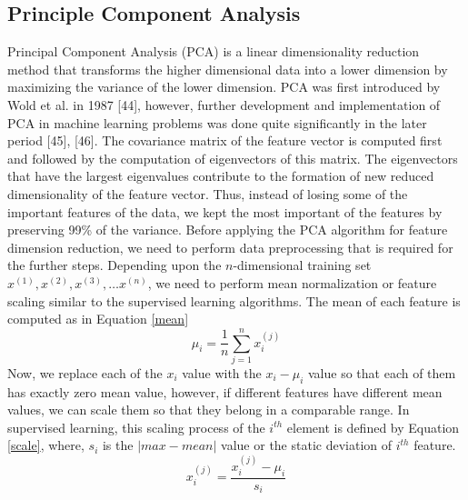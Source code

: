 \documentclass{llncs}
\begin{document}
\subsection{Principle Component Analysis}
Principal Component Analysis (PCA) is a linear dimensionality reduction method that transforms the higher dimensional data into a lower dimension by maximizing the variance of the lower dimension. PCA was first introduced by Wold et al. in 1987 [44], however, further development and implementation of PCA in machine learning problems was done quite significantly in the later period [45], [46]. The covariance matrix of the feature vector is computed first and followed by the computation of eigenvectors of this matrix. The eigenvectors that have the largest eigenvalues contribute to the formation of new reduced dimensionality of the feature vector. Thus, instead of losing some of the important features of the data, we kept the most important of the features by preserving 99\% of the variance.
Before applying the PCA algorithm for feature dimension reduction, we need to perform data preprocessing that is required for the further steps. Depending upon the $n$-dimensional training set $x^{(1)}, x^{(2)}, x^{(3)}, \hdots x^{(n)}$, we need to perform mean normalization or feature scaling similar to the supervised learning algorithms. The mean of each feature is computed as in Equation \ref{mean}
\begin{equation}\label{mean}
    \mu_i = \frac{1}{n}\sum_{j = 1}^{n}x_i^{(j)}
\end{equation}
Now, we replace each of the $x_i$ value with the $x_i - \mu_i$ value so that each of them has exactly zero mean value, however, if different features have different mean values, we can scale them so that they belong in a comparable range. In supervised learning, this scaling process of the $i^{th}$ element is defined by Equation \ref{scale}, where, $s_i$ is the $|max-mean|$ value or the static deviation of $i^{th}$ feature.
\begin{equation}\label{scale}
    x_i^{(j)}=\frac{x_i^{(j)}-\mu_i}{s_i}
\end{equation}
\end{document}
